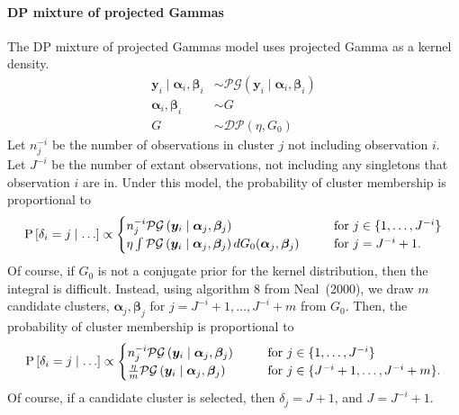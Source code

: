 \documentclass[12pt]{article}
\begin{document}
\paragraph{DP mixture of projected Gammas}
The DP mixture of projected Gammas model uses projected Gamma as a kernel density.
\begin{equation}
    \begin{aligned}
        \bm{y}_i\mid\bm{\alpha}_i,\bm{\beta}_i &\sim \mathcal{PG}(\bm{y}_i\mid\bm{\alpha}_i,\bm{\beta}_i)\\
        \bm{\alpha}_i,\bm{\beta}_i &\sim G\\
        G &\sim \mathcal{DP}\left(\eta,G_0\right)
    \end{aligned}
\end{equation}
Let $n_j^{-i}$ be the number of observations in cluster $j$ not including observation $i$.  Let $J^{-i}$ be the number of extant observations, not including any singletons that observation $i$ are in. 
Under this model, the probability of cluster membership is proportional to
\begin{equation*}
    \text{P}\left[\delta_i = j\mid\ldots\right] \propto \begin{cases}
        n_j^{-i}\mathcal{PG}\left(\bm{y}_i\mid\bm{\alpha}_j,\bm{\beta}_j\right)\hspace{0.5cm} &\text{~for~}j \in \lbrace 1,\ldots,J^{-i}\rbrace\\
        \eta\int\mathcal{PG}\left(\bm{y}_i\mid\bm{\alpha}_j,\bm{\beta}_j\right)dG_0(\bm{\alpha}_j,\bm{\beta}_j)\hspace{0.5cm} &\text{~for~}j = J^{-i} + 1.
        \end{cases}
\end{equation*}
Of course, if $G_0$ is not a conjugate prior for the kernel distribution, then the integral is difficult.  Instead, using algorithm 8 from Neal~(2000), we draw $m$ candidate clusters, $\bm{\alpha}_j,\bm{\beta}_j$ for $j = J^{-i} + 1,\ldots, J^{-i} + m$ from $G_0$. Then, the probability of cluster membership is proportional to
\begin{equation}
    \text{P}\left[\delta_i = j\mid\ldots\right] \propto \begin{cases}
        n_j^{-i}\mathcal{PG}\left(\bm{y}_i\mid\bm{\alpha}_j,\bm{\beta}_j\right)\hspace{0.5cm} &\text{~for~}j \in \lbrace 1,\ldots,J^{-i}\rbrace\\
        \frac{\eta}{m}\mathcal{PG}\left(\bm{y}_i\mid\bm{\alpha}_j,\bm{\beta}_j\right)\hspace{0.5cm} &\text{~for~}j \in \lbrace J^{-i} + 1,\ldots, J^{-i} + m\rbrace.
        \end{cases}
\end{equation}
Of course, if a candidate cluster is selected, then $\delta_j = J + 1$, and $J = J^{-i} + 1$.
\end{document}
